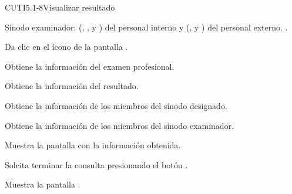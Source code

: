 \begin{UseCase}{CUTI5.1-8}{Visualizar resultado}
{\begin{UClist}
			\UCli Sínodo examinador:  (, ,  y ) del personal interno y (,  y ) del personal externo. \ioObtener.						
		\end{UClist}
	}

\end{UseCase}

\begin{UCtrayectoria}
	
	\UCpaso[\UCactor] Da clic en el ícono \btnVer de la pantalla .
	
	\UCpaso[\UCsist] Obtiene la información del examen profesional.
	
	\UCpaso[\UCsist] Obtiene la información del resultado.
	
	\UCpaso[\UCsist] Obtiene la información de los miembros del sínodo designado.
	
	\UCpaso[\UCsist] Obtiene la información de los miembros del sínodo examinador.
	
	\UCpaso[\UCsist] Muestra la pantalla  con la información obtenida.
	
	\UCpaso[\UCactor] Solcita terminar la consulta presionando el botón .  \label{CUTI5.1-8:terminaConsulta}
	
	\UCpaso[\UCsist] Muestra la pantalla .
	
\end{UCtrayectoria}


